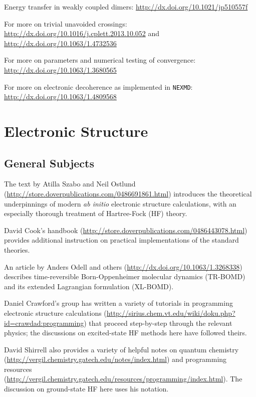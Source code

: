 \documentclass[12pt,letter,footinclude=true,headinclude=true,hyphens,oneside]{book} %
\begin{document}
    
    Energy transfer in weakly coupled dimers:  \url{http://dx.doi.org/10.1021/jp510557f}
    
    
    \noindent For more on trivial unavoided crossings: \url{http://dx.doi.org/10.1016/j.cplett.2013.10.052} and \url{http://dx.doi.org/10.1063/1.4732536}
    
    
    \noindent For more on parameters and numerical testing of convergence: \url{http://dx.doi.org/10.1063/1.3680565}
    
    
    \noindent For more on electronic decoherence as implemented in \texttt{NEXMD}: \url{http://dx.doi.org/10.1063/1.4809568}
    
    \section{Electronic Structure}
    
    \subsection{General Subjects}
    
    The text by Atilla Szabo and Neil Ostlund (\url{http://store.doverpublications.com/0486691861.html}) introduces the theoretical underpinnings of modern \emph{ab initio} electronic structure calculations, with an especially thorough treatment of Hartree-Fock (HF) theory. 
    
    
    \noindent David Cook's handbook (\url{http://store.doverpublications.com/0486443078.html}) provides additional instruction on practical implementations of the standard theories.
    
    
    \noindent An article by Anders Odell and others (\url{http://dx.doi.org/10.1063/1.3268338}) describes time-reversible Born-Oppenheimer molecular dynamics (TR-BOMD) and its extended Lagrangian formulation (XL-BOMD).
    
    
    \noindent Daniel Crawford's group has written a variety of tutorials in programming electronic structure calculations (\url{http://sirius.chem.vt.edu/wiki/doku.php?id=crawdad:programming}) that proceed step-by-step through the relevant physics; the discussions on excited-state HF methods here have followed theirs.
    
    
    \noindent David Shirrell also provides a variety of helpful notes on quantum chemistry (\url{http://vergil.chemistry.gatech.edu/notes/index.html}) and programming resources (\url{http://vergil.chemistry.gatech.edu/resources/programming/index.html}). The discussion on ground-state HF here uses his notation.
    
\end{document}
